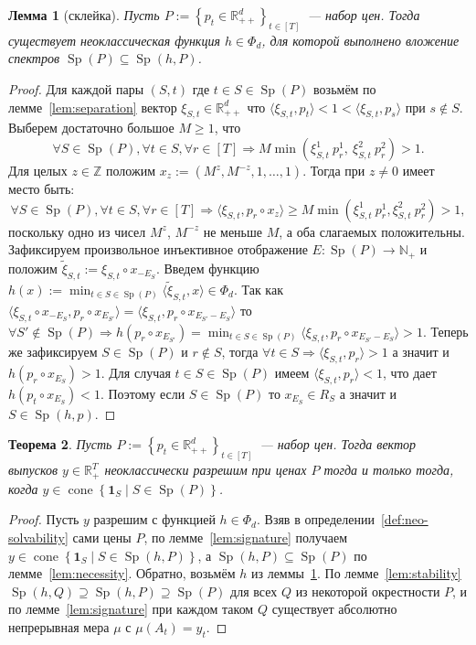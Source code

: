 \documentclass[a4paper,11pt]{article}
\theoremstyle{plain}
\newtheorem{theorem}{Теорема}[section]
\newtheorem{lemma}[theorem]{Лемма}
\theoremstyle{definition}
\theoremstyle{remark}
\newcommand{\R}{\mathbb{R}}
\newcommand{\Z}{\mathbb{Z}}
\newcommand{\N}{\mathbb{N}}
\newcommand{\set}[1]{\left\{ #1 \right\}}
\newcommand{\ip}[2]{\langle #1, #2\rangle} %
\newcommand{\Rpp}[1][2]{\R^{#1}_{++}} %
\newcommand{\Rp}[1][2]{\R^{#1}_{+}}   %
\DeclareMathOperator{\cone}{cone}
\DeclareMathOperator{\Sp}{Sp}
\begin{document}
\begin{lemma}[склейка]\label{lem:patch}
    Пусть $P:=\set{p_{t}\in\Rpp[d]}_{t\in[T]}$~--- набор цен. Тогда существует неоклассическая функция $h\in\Phi_d$, для которой выполнено вложение спектров $\Sp(P)\subseteq\Sp(h,P)$.
\end{lemma}

\begin{proof}
    Для каждой пары $(S,t)$ где $t\in S\in\Sp(P)$ возьмём по лемме~\ref{lem:separation} вектор $\xi_{S,t}\in\Rpp[d]$ что $\ip{\xi_{S,t}}{p_t}<1<\ip{\xi_{S,t}}{p_s}$ при $s\notin S$. Выберем достаточно большое $M\ge1$, что
    \[\forall S\in\Sp(P),\forall t\in S,\forall r\in[T]\Rightarrow M\min(\xi^{1}_{S, t}\ p^{1}_{r},\ \xi^{2}_{S, t}\ p^{2}_{r})>1.\]
    Для целых $z\in\Z$ положим $x_z:=(M^z,M^{-z},1,\dots,1)$. Тогда при $z\ne0$ имеет место быть:
    \[\forall S\in\Sp(P),\forall t\in S,\forall r\in[T]\Rightarrow\ip{\xi_{S, t}}{p_{r}\circ x_z}\ge M\min(\xi^{1}_{S, t}\ p^{1}_{r},\xi^{2}_{S, t}\ p^{2}_{r})>1,\]
    поскольку одно из чисел $M^z$, $M^{-z}$ не меньше $M$, а оба слагаемых положительны. Зафиксируем произвольное инъективное отображение $E:\Sp(P)\to\N_{+}$ и положим $\tilde\xi_{S,t}:=\xi_{S,t}\circ x_{-E_S}$. 
    Введем функцию $h(x):=\min_{t\in S\in\Sp(P)}\ip{\tilde\xi_{S,t}}{x}\in\Phi_d$. Так как $\ip{\xi_{S,t}\circ x_{-E_{S}}}{p_{r}\circ x_{E_{S'}}} = \ip{\xi_{S,t}}{p_{r}\circ x_{E_{S'} - E_{S}}}$ то $\forall S'\notin\Sp(P)\Rightarrow h(p_{r}\circ x_{E_{S'}}) = \min_{t\in S\in\Sp(P)}\ip{\xi_{S,t}}{p_{r}\circ x_{E_{S'} - E_{S}}} > 1$. Теперь  же зафиксируем $S\in\Sp(P)\text{ и }r\notin S$, тогда $\forall t\in S\Rightarrow\ip{\xi_{S,t}}{p_{r}} > 1$ а значит и $h(p_{r}\circ x_{E_{S}}) > 1$.
    Для случая $t\in S\in\Sp(P)$ имеем $\ip{\xi_{S,t}}{p_{r}}<1$, что дает $h(p_{t}\circ x_{E_{S}})<1$. Поэтому если $S\in\Sp(P)$ то $x_{E_{S}}\in R_{S}$ а значит и $S\in\Sp(h, p)$.
\end{proof}

\begin{theorem}\label{thm:solvability}
    Пусть $P:=\set{p_{t}\in\Rpp[d]}_{t\in[T]}$~--- набор цен. Тогда вектор выпусков $y\in\Rp[T]$ неоклассически разрешим при ценах $P$ тогда и только тогда, когда $y\in\cone\set{\mathbf 1_S\mid S\in\Sp(P)}$.
\end{theorem}

\begin{proof}
    Пусть $y$ разрешим с функцией $h\in\Phi_d$. Взяв в определении~\ref{def:neo-solvability} сами цены $P$, по лемме~\ref{lem:signature} получаем $y\in\cone\set{\mathbf 1_S\mid S\in\Sp(h,P)}$, а $\Sp(h,P)\subseteq\Sp(P)$ по лемме~\ref{lem:necessity}. Обратно, возьмём $h$ из леммы~\ref{lem:patch}. По лемме~\ref{lem:stability} $\Sp(h,Q)\supseteq\Sp(h,P)\supseteq\Sp(P)$ для всех $Q$ из некоторой окрестности $P$, и по лемме~\ref{lem:signature} при каждом таком $Q$ существует абсолютно непрерывная мера $\mu$ с $\mu(A_t)=y_t$.
\end{proof}
\end{document}
